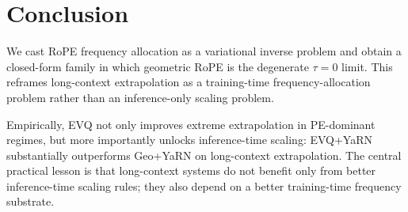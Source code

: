 \section{Conclusion}

We cast RoPE frequency allocation as a variational inverse problem and obtain a closed-form family in which geometric RoPE is the degenerate \(\tau=0\) limit. This reframes long-context extrapolation as a training-time frequency-allocation problem rather than an inference-only scaling problem.

Empirically, EVQ not only improves extreme extrapolation in PE-dominant regimes, but more importantly unlocks inference-time scaling: EVQ+YaRN substantially outperforms Geo+YaRN on long-context extrapolation. The central practical lesson is that long-context systems do not benefit only from better inference-time scaling rules; they also depend on a better training-time frequency substrate.
